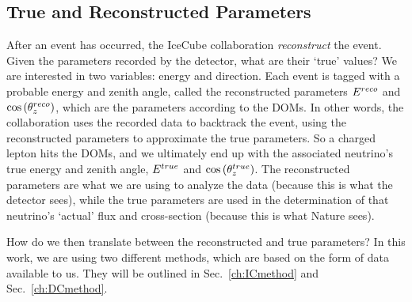 \subsection{True and Reconstructed Parameters}
After an event has occurred, the IceCube collaboration \emph{reconstruct} the event. 
Given the parameters recorded by the detector, what are their `true' values?
We are interested in two variables: energy and direction. Each event is tagged with a probable energy and zenith angle, 
called the reconstructed parameters $E^{reco}$ and $\cos{(\theta_z^{reco})}$, which are the parameters according to the DOMs.
In other words, the collaboration uses the recorded data to backtrack the event, using the reconstructed parameters to approximate the true parameters. 
So a charged lepton hits the DOMs, and we ultimately end up with the associated neutrino's true energy and zenith angle, $E^{true}$ and $\cos{(\theta_z^{true})}$. 
The reconstructed parameters are what we are using to analyze the data (because this is what the detector sees), while the true parameters are used in the 
determination of that neutrino's `actual' flux and cross-section (because this is what Nature sees).

How do we then translate between the reconstructed and true parameters? 
In this work, we are using two different methods, which are based on the form of data available to us. 
They will be outlined in Sec.~\ref{ch:ICmethod} and Sec.~\ref{ch:DCmethod}.